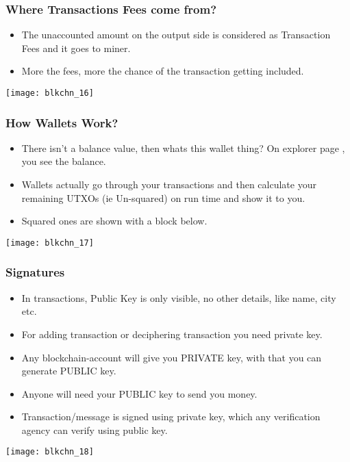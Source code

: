 \begin{frame}[fragile]\frametitle{Where Transactions Fees come from?}
\begin{itemize}
\item The unaccounted amount on the output side is considered as Transaction Fees and it goes to miner.
\item More the fees, more the chance of the transaction getting included.
\end{itemize}

\begin{center}
\texttt{[image: blkchn\_16]}
\end{center}
\end{frame}

\begin{frame}[fragile]\frametitle{How Wallets Work?}
\begin{itemize}
\item There isn't a balance value, then whats this wallet thing? On explorer page , you see the balance.
\item Wallets actually go through your transactions and then calculate your remaining UTXOs (ie Un-squared) on run time and show it to you.
\item Squared ones are shown with a block below.
\end{itemize}

\begin{center}
\texttt{[image: blkchn\_17]}
\end{center}
\end{frame}

\begin{frame}[fragile]\frametitle{Signatures}
\begin{itemize}
\item In transactions, Public Key is only visible, no other details, like name, city etc.
\item For adding transaction or deciphering transaction you need private key.
\item Any blockchain-account will give you PRIVATE key, with that you can generate PUBLIC key.
\item Anyone will need your PUBLIC key to send you money.
\item Transaction/message is signed using private key, which any verification agency can verify using public key.
\end{itemize}

\begin{center}
\texttt{[image: blkchn\_18]}
\end{center}
\end{frame}

